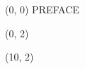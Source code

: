 \documentclass[10pt]{article}
\begin{document}
\begin{textblock}{23}(0, 0)
\center\huge PREFACE
\end{textblock}

\begin{textblock}{9}(0, 2)
    {}
    {}
\end{textblock}

\begin{textblock}{13}(10, 2)
    {}
    {}
\end{textblock}
\end{document}
